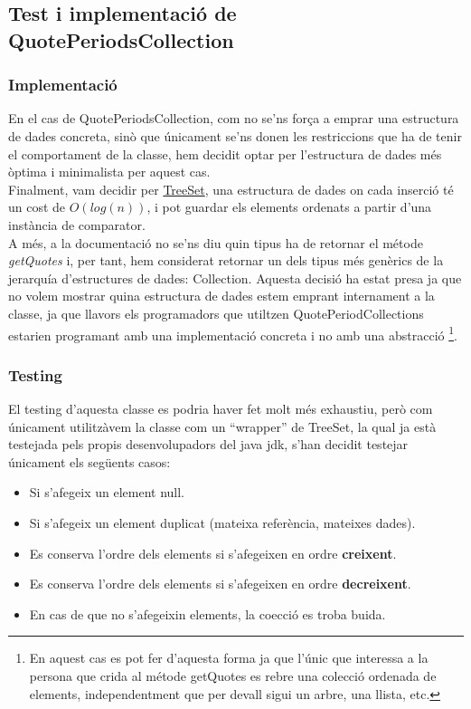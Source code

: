 \documentclass[12pt, letterpaper]{article}
\begin{document}
\subsection{Test i implementació de QuotePeriodsCollection}
\label{QuotePeriodsCollection}

\subsubsection{Implementació}
En el cas de QuotePeriodsCollection, com no se'ns força a emprar una estructura de dades concreta, sinò que únicament se'ns donen les restriccions que ha de tenir el comportament de la classe, hem decidit optar per l'estructura de dades més òptima i minimalista per aquest cas.\\

Finalment, vam decidir per \href{https://docs.oracle.com/javase/7/docs/api/java/util/TreeSet.html}{TreeSet}, una estructura de dades on cada inserció té un cost de $O(log(n))$, i pot guardar els elements ordenats a partir d'una instància de comparator. \\

A més, a la documentació no se'ns diu quin tipus ha de retornar el métode \textit{getQuotes} i, per tant, hem considerat retornar un dels tipus més genèrics de la jerarquía d'estructures de dades: Collection. Aquesta decisió ha estat presa ja que no volem mostrar quina estructura de dades estem emprant internament a la classe, ja que llavors els programadors que utiltzen QuotePeriodCollections estarien programant amb una implementació concreta i no amb una abstracció \footnote{En aquest cas es pot fer d'aquesta forma ja que l'únic que interessa a la persona que crida al métode getQuotes es rebre una col\lgem ecció ordenada de elements, independentment que per devall sigui un arbre, una llista, etc.}.

\subsubsection{Testing}
El testing d'aquesta classe es podria haver fet molt més exhaustiu, però com únicament utilitzàvem la classe com un ``wrapper'' de TreeSet, la qual ja està testejada pels propis desenvolupadors del java jdk, s'han decidit testejar únicament els següents casos:
\begin{itemize}
  \item Si s'afegeix un element null.
  \item Si s'afegeix un element duplicat (mateixa referència, mateixes dades).
  \item Es conserva l'ordre dels elements si s'afegeixen en ordre \textbf{creixent}.
  \item Es conserva l'ordre dels elements si s'afegeixen en ordre \textbf{decreixent}.
  \item En cas de que no s'afegeixin elements, la co\lgem ecció es troba buida.
\end{itemize}
\end{document}
